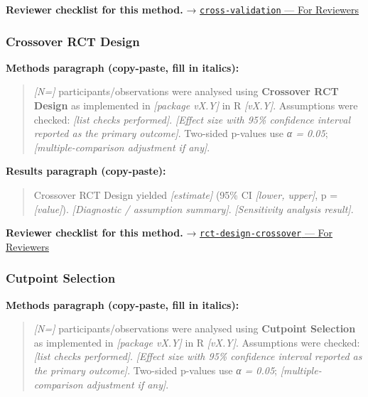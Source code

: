 \documentclass[
]{article}
\begin{document}
\textbf{Reviewer checklist for this method.} →
\href{../chapters/13-ml/cross-validation.Rmd\#for-reviewers}{\texttt{cross-validation}
--- For Reviewers}

\subsubsection{Crossover RCT Design}\label{crossover-rct-design}

\textbf{Methods paragraph (copy-paste, fill in italics):}

\begin{quote}
\emph{{[}N={]}} participants/observations were analysed using
\textbf{Crossover RCT Design} as implemented in \emph{{[}package
vX.Y{]}} in R \emph{{[}vX.Y{]}}. Assumptions were checked: \emph{{[}list
checks performed{]}}. \emph{{[}Effect size with 95\% confidence interval
reported as the primary outcome{]}}. Two-sided p-values use \emph{α =
0.05}; \emph{{[}multiple-comparison adjustment if any{]}}.
\end{quote}

\textbf{Results paragraph (copy-paste):}

\begin{quote}
Crossover RCT Design yielded \emph{{[}estimate{]}} (95\% CI
\emph{{[}lower, upper{]}}, p = \emph{{[}value{]}}). \emph{{[}Diagnostic
/ assumption summary{]}}. \emph{{[}Sensitivity analysis result{]}}.
\end{quote}

\textbf{Reviewer checklist for this method.} →
\href{../chapters/14-clinical/rct-design-crossover.Rmd\#for-reviewers}{\texttt{rct-design-crossover}
--- For Reviewers}

\subsubsection{Cutpoint Selection}\label{cutpoint-selection}

\textbf{Methods paragraph (copy-paste, fill in italics):}

\begin{quote}
\emph{{[}N={]}} participants/observations were analysed using
\textbf{Cutpoint Selection} as implemented in \emph{{[}package vX.Y{]}}
in R \emph{{[}vX.Y{]}}. Assumptions were checked: \emph{{[}list checks
performed{]}}. \emph{{[}Effect size with 95\% confidence interval
reported as the primary outcome{]}}. Two-sided p-values use \emph{α =
0.05}; \emph{{[}multiple-comparison adjustment if any{]}}.
\end{quote}
\end{document}
